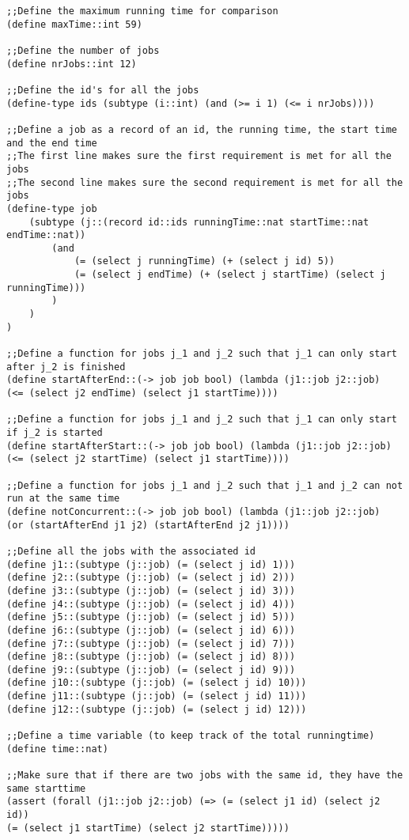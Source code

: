 \documentclass[12pt]{article}
\begin{document}
{\footnotesize
\begin{verbatim}
;;Define the maximum running time for comparison
(define maxTime::int 59)

;;Define the number of jobs
(define nrJobs::int 12)

;;Define the id's for all the jobs
(define-type ids (subtype (i::int) (and (>= i 1) (<= i nrJobs))))

;;Define a job as a record of an id, the running time, the start time and the end time
;;The first line makes sure the first requirement is met for all the jobs
;;The second line makes sure the second requirement is met for all the jobs
(define-type job
	(subtype (j::(record id::ids runningTime::nat startTime::nat endTime::nat))
		(and
			(= (select j runningTime) (+ (select j id) 5))
			(= (select j endTime) (+ (select j startTime) (select j runningTime)))
		)
	)
)

;;Define a function for jobs j_1 and j_2 such that j_1 can only start after j_2 is finished
(define startAfterEnd::(-> job job bool) (lambda (j1::job j2::job)
(<= (select j2 endTime) (select j1 startTime))))

;;Define a function for jobs j_1 and j_2 such that j_1 can only start if j_2 is started
(define startAfterStart::(-> job job bool) (lambda (j1::job j2::job)
(<= (select j2 startTime) (select j1 startTime))))

;;Define a function for jobs j_1 and j_2 such that j_1 and j_2 can not run at the same time
(define notConcurrent::(-> job job bool) (lambda (j1::job j2::job)
(or (startAfterEnd j1 j2) (startAfterEnd j2 j1))))

;;Define all the jobs with the associated id
(define j1::(subtype (j::job) (= (select j id) 1)))
(define j2::(subtype (j::job) (= (select j id) 2)))
(define j3::(subtype (j::job) (= (select j id) 3)))
(define j4::(subtype (j::job) (= (select j id) 4)))
(define j5::(subtype (j::job) (= (select j id) 5)))
(define j6::(subtype (j::job) (= (select j id) 6)))
(define j7::(subtype (j::job) (= (select j id) 7)))
(define j8::(subtype (j::job) (= (select j id) 8)))
(define j9::(subtype (j::job) (= (select j id) 9)))
(define j10::(subtype (j::job) (= (select j id) 10)))
(define j11::(subtype (j::job) (= (select j id) 11)))
(define j12::(subtype (j::job) (= (select j id) 12)))

;;Define a time variable (to keep track of the total runningtime)
(define time::nat)

;;Make sure that if there are two jobs with the same id, they have the same starttime
(assert (forall (j1::job j2::job) (=> (= (select j1 id) (select j2 id))
(= (select j1 startTime) (select j2 startTime)))))


\end{verbatim}}
\end{document}
